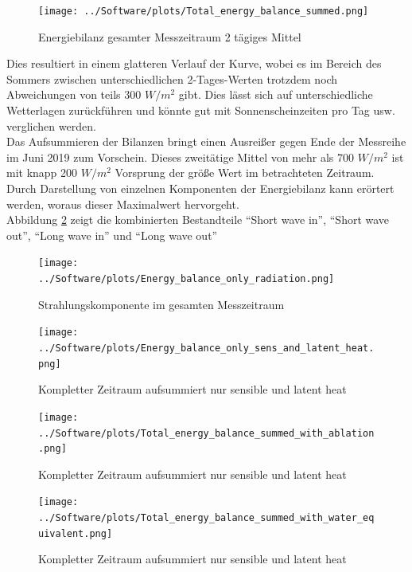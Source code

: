 \documentclass[12pt,a4paper]{article}
\begin{document}
\begin{figure}[H]
\centering
\texttt{[image: ../Software/plots/Total\_energy\_balance\_summed.png]}
\caption{Energiebilanz gesamter Messzeitraum 2 tägiges Mittel}
\label{fig:..}
\end{figure}

 Dies resultiert in einem glatteren Verlauf der Kurve, wobei es im Bereich des Sommers zwischen unterschiedlichen 2-Tages-Werten trotzdem noch Abweichungen von teils 300 $W/m^2$ gibt. Dies lässt sich auf unterschiedliche Wetterlagen zurückführen und könnte gut mit Sonnenscheinzeiten pro Tag usw. verglichen werden.\\
Das Aufsummieren der Bilanzen bringt einen Ausreißer gegen Ende der Messreihe im Juni 2019 zum Vorschein. Dieses zweitätige Mittel von mehr als 700 $W/m^2$ ist mit knapp 200 $W/m^2$ Vorsprung der größe Wert im betrachteten Zeitraum. Durch Darstellung von einzelnen Komponenten der Energiebilanz kann erörtert werden, woraus dieser Maximalwert hervorgeht.\\

Abbildung \ref{fig:Strahlungskomponente im gesamten Messzeitraum} zeigt die kombinierten Bestandteile ``Short wave in'', ``Short wave out'', ``Long wave in'' und ``Long wave out''

\begin{figure}[H]
\centering
\texttt{[image: ../Software/plots/Energy\_balance\_only\_radiation.png]}
\caption{Strahlungskomponente im gesamten Messzeitraum}
\label{fig:Strahlungskomponente im gesamten Messzeitraum}
\end{figure}


\begin{figure}[H]
\centering
\texttt{[image: ../Software/plots/Energy\_balance\_only\_sens\_and\_latent\_heat.png]}
\caption{Kompletter Zeitraum aufsummiert nur sensible und latent heat}
\label{fig:..}
\end{figure}

\begin{figure}[H]
\centering
\texttt{[image: ../Software/plots/Total\_energy\_balance\_summed\_with\_ablation.png]}
\caption{Kompletter Zeitraum aufsummiert nur sensible und latent heat}
\label{fig:..}
\end{figure}


\begin{figure}[H]
\centering
\texttt{[image: ../Software/plots/Total\_energy\_balance\_summed\_with\_water\_equivalent.png]}
\caption{Kompletter Zeitraum aufsummiert nur sensible und latent heat}
\label{fig:..}
\end{figure}
\end{document}
